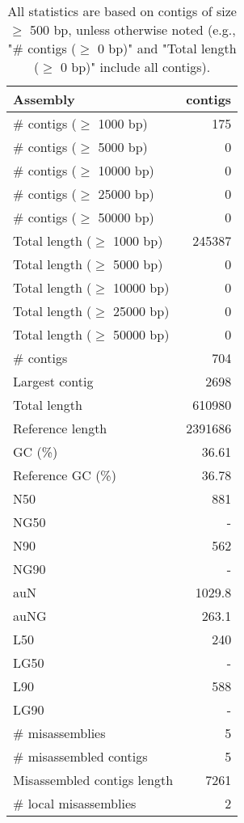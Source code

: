 \documentclass[12pt,a4paper]{article}
\begin{document}
\begin{table}[ht]
\begin{center}
\caption{All statistics are based on contigs of size $\geq$ 500 bp, unless otherwise noted (e.g., "\# contigs ($\geq$ 0 bp)" and "Total length ($\geq$ 0 bp)" include all contigs).}
\begin{tabular}{|l*{1}{|r}|}
\hline
Assembly & contigs \\ \hline
\# contigs ($\geq$ 1000 bp) & 175 \\ \hline
\# contigs ($\geq$ 5000 bp) & 0 \\ \hline
\# contigs ($\geq$ 10000 bp) & 0 \\ \hline
\# contigs ($\geq$ 25000 bp) & 0 \\ \hline
\# contigs ($\geq$ 50000 bp) & 0 \\ \hline
Total length ($\geq$ 1000 bp) & 245387 \\ \hline
Total length ($\geq$ 5000 bp) & 0 \\ \hline
Total length ($\geq$ 10000 bp) & 0 \\ \hline
Total length ($\geq$ 25000 bp) & 0 \\ \hline
Total length ($\geq$ 50000 bp) & 0 \\ \hline
\# contigs & 704 \\ \hline
Largest contig & 2698 \\ \hline
Total length & 610980 \\ \hline
Reference length & 2391686 \\ \hline
GC (\%) & 36.61 \\ \hline
Reference GC (\%) & 36.78 \\ \hline
N50 & 881 \\ \hline
NG50 & - \\ \hline
N90 & 562 \\ \hline
NG90 & - \\ \hline
auN & 1029.8 \\ \hline
auNG & 263.1 \\ \hline
L50 & 240 \\ \hline
LG50 & - \\ \hline
L90 & 588 \\ \hline
LG90 & - \\ \hline
\# misassemblies & 5 \\ \hline
\# misassembled contigs & 5 \\ \hline
Misassembled contigs length & 7261 \\ \hline
\# local misassemblies & 2 \\ \hline

\end{tabular}
\end{center}
\end{table}
\end{document}
